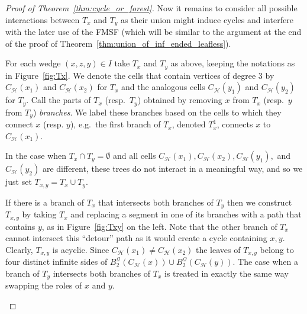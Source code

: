 \documentclass{article}
\theoremstyle{plain}
\theoremstyle{definition}
\newcommand{\cH}{\mathcal{H}}
\begin{document}
\begin{proof}[Proof of Theorem~\ref{thm:cycle_or_forest}]
Now it remains to consider all possible interactions between $T_x$ and $T_y$ as their union might induce cycles and interfere with the later use of the FMSF (which will be similar to the argument at the end of the proof of Theorem~\ref{thm:union_of_inf_ended_leafless}).

For each wedge $(x,z,y)\in I$ take $T_x$ and $T_y$ as above, keeping the notations as in Figure~\ref{fig:Tx}. We denote the cells that contain vertices of degree 3 by $C_{\cH}(x_1)$ and $C_{\cH}(x_2)$ for $T_x$ and the analogous cells $C_{\cH}(y_1)$ and $C_{\cH}(y_2)$ for $T_y$. Call the parts of $T_x$ (resp.~$T_y$) obtained by removing $x$ from $T_x$ (resp.~$y$ from $T_y$) \emph{branches}. We label these branches based on the cells to which they connect $x$ (resp. $y$), e.g.\ the first branch of $T_x$, denoted $T_x^1$, connects $x$ to $C_{\cH}(x_1)$.

In the case when $T_x\cap T_y=\emptyset$ and all cells $C_{\cH}(x_1),C_{\cH}(x_2),C_{\cH}(y_1),$ and $C_{\cH}(y_2)$ are different, these trees do not interact in a meaningful way, and so we just set $T_{x,y}=T_x\cup T_y$.

If there is a branch of $T_x$ that intersects both branches of $T_y$ then we construct $T_{x,y}$ by taking $T_x$ and replacing a segment in one of its branches with a path that contains $y$, as in Figure~\ref{fig:Txy} on the left. Note that the other branch of $T_x$ cannot intersect this ``detour'' path as it would create a cycle containing $x,y$. Clearly, $T_{x,y}$ is acyclic. Since $C_{\cH}(x_1)\neq C_{\cH}(x_2)$ the leaves of $T_{x,y}$ belong to four distinct infinite sides of $B_2^{\mathcal{Q}}(C_{\cH}(x))\cup B_2^{\mathcal{Q}}(C_{\cH}(y))$. The case when a branch of $T_y$ intersects both branches of $T_x$ is treated in exactly the same way swapping the roles of $x$ and $y$. 

\begin{figure}[htb]
\begin{center}
\end{center}
\end{figure}
\end{proof}
\end{document}
